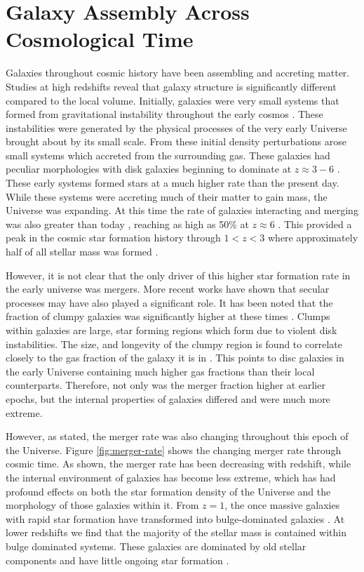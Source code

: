 \section{Galaxy Assembly Across Cosmological Time}
\noindent Galaxies throughout cosmic history have been assembling and accreting matter. Studies at high redshifts reveal that galaxy structure is significantly different compared to the local volume. Initially, galaxies were very small systems that formed from gravitational instability throughout the early cosmos \citep{1993MNRAS.262..627L}. These instabilities were generated by the physical processes of the very early Universe brought about by its small scale. From these initial density perturbations arose small systems which accreted from the surrounding gas. These galaxies had peculiar morphologies \citep{2005ApJ...627..632E} with disk galaxies beginning to dominate at $z\approx3 - 6$ \citep{2022ApJ...938L...2F}. These early systems formed stars at a much higher rate than the present day. While these systems were accreting much of their matter to gain mass, the Universe was expanding. At this time the rate of galaxies interacting and merging was also greater than today \citep{2010ApJ...715..202H, 2011ApJ...742..103L}, reaching as high as 50\% at $z\approx6$ \citep{2009MNRAS.397..208C, 2009MNRAS.394L..51B}. This provided a peak in the cosmic star formation history through $1 < z < 3$ where approximately half of all stellar mass was formed \citep{2005ApJ...625..621B}.

However, it is not clear that the only driver of this higher star formation rate in the early universe was mergers. More recent works have shown that secular processes may have also played a significant role. It has been noted that the fraction of clumpy galaxies was significantly higher at these times \citep{2012ApJ...760..130S, 2020MNRAS.499.5241C,  2023ApJ...955...92V}. Clumps within galaxies are large, star forming regions which form due to violent disk instabilities. The size, and longevity of the clumpy region is found to correlate closely to the gas fraction of the galaxy it is in \citep{2021MNRAS.505.3579F}. This points to disc galaxies in the early Universe containing much higher gas fractions \citep{2010Natur.463..781T, 2023ApJ...943...82S} than their local counterparts. Therefore, not only was the merger fraction higher at earlier epochs, but the internal properties of galaxies differed and were much more extreme.

However, as stated, the merger rate was also changing throughout this epoch of the Universe. Figure \ref{fig:merger-rate} shows the changing merger rate through cosmic time. As shown, the merger rate has been decreasing with redshift, while the internal environment of galaxies has become less extreme, which has had profound effects on both the star formation density of the Universe and the morphology of those galaxies within it. From $z = 1$, the once massive galaxies with rapid star formation have transformed into bulge-dominated galaxies \citep{2007ApJ...654..858B}. At lower redshifts we find that the majority of the stellar mass is contained within bulge dominated systems. These galaxies are dominated by old stellar components and have little ongoing star formation \citep{2002AJ....124..646H, 2004ApJ...608..752B}.

